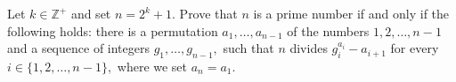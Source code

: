 Let 
$k \in \mathbb{Z}^+$
 and set 
$n=2^k+1.$
 Prove that 
$n$
 is a prime number if and only if the following holds: there is a permutation 
$a_{1},\ldots,a_{n-1}$
 of the numbers 
$1,2, \ldots, n-1$
 and a sequence of integers 
$g_{1},\ldots,g_{n-1},$
 such that 
$n$
 divides 
$g^{a_i}_i - a_{i+1}$
 for every 
$i \in \{1,2,\ldots,n-1\},$
 where we set 
$a_n = a_1.$

